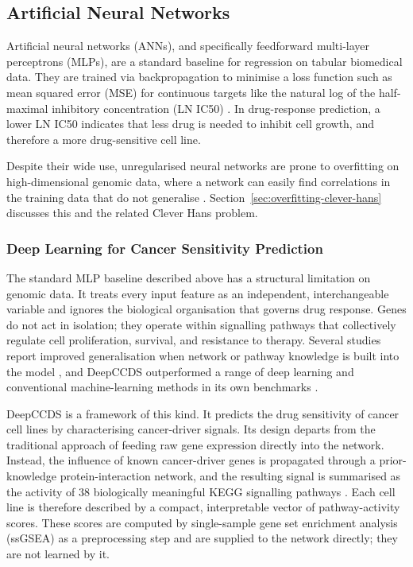 \subsection{Artificial Neural Networks}\label{sec:ann}

Artificial neural networks (ANNs), and specifically feedforward multi-layer perceptrons (MLPs), are a standard baseline for regression on tabular biomedical data. They are trained via backpropagation to minimise a loss function such as mean squared error (MSE) for continuous targets like the natural log of the half-maximal inhibitory concentration (LN IC50) \citep{goodfellow2016,arrieta2020}. In drug-response prediction, a lower LN IC50 indicates that less drug is needed to inhibit cell growth, and therefore a more drug-sensitive cell line.

Despite their wide use, unregularised neural networks are prone to overfitting on high-dimensional genomic data, where a network can easily find correlations in the training data that do not generalise \citep{klauschen2024}. Section~\ref{sec:overfitting-clever-hans} discusses this and the related Clever Hans problem.

\subsubsection{Deep Learning for Cancer Sensitivity Prediction}\label{sec:deep-learning-cancer-sensitivity}

The standard MLP baseline described above has a structural limitation on genomic data. It treats every input feature as an independent, interchangeable variable and ignores the biological organisation that governs drug response. Genes do not act in isolation; they operate within signalling pathways that collectively regulate cell proliferation, survival, and resistance to therapy. Several studies report improved generalisation when network or pathway knowledge is built into the model \citep{partin2023}, and DeepCCDS outperformed a range of deep learning and conventional machine-learning methods in its own benchmarks \citep{wu2025}.

DeepCCDS \citep{wu2025} is a framework of this kind. It predicts the drug sensitivity of cancer cell lines by characterising cancer-driver signals. Its design departs from the traditional approach of feeding raw gene expression directly into the network. Instead, the influence of known cancer-driver genes is propagated through a prior-knowledge protein-interaction network, and the resulting signal is summarised as the activity of 38 biologically meaningful KEGG signalling pathways \citep{wu2025}. Each cell line is therefore described by a compact, interpretable vector of pathway-activity scores. These scores are computed by single-sample gene set enrichment analysis (ssGSEA) as a preprocessing step and are supplied to the network directly; they are not learned by it.

